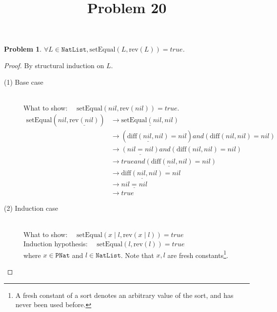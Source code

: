 \documentclass[12pt, a4paper]{article}
\title{Problem 20}
\date{\vspace{-5ex}}
\newtheorem{problem}{Problem}
\newcommand{\rel}[1]{\mathrel{#1}}
\newcommand{\rmx}[1]{\mathrm{#1}}
\newcommand{\larrow}{\longrightarrow}
\newcommand{\under}{\underline}
\begin{document}
\maketitle

\begin{problem}
$\forall L \in \mathtt{NatList}, \rmx{setEqual}(L, \rmx{rev}(L)) = true$.
\end{problem}
\begin{proof}
By structural induction on $L$.
\begin{description}
\item[(1) Base case]~\\
\noindent
What to show: $\quad \rmx{setEqual}(nil, \rmx{rev}(nil)) = true$.
\begin{align*}
\rmx{setEqual}(nil, \under{\rmx{rev}(nil)})
	&\larrow \under{\rmx{setEqual}(nil, nil)} \tag{by rev1} \\
	&\larrow (\under{\rmx{diff}(nil, nil)} = nil) \rel{and} (\rmx{diff}(nil, nil) = nil) \tag{by setEq} \\
	&\larrow \under{(nil = nil)} \rel{and} (\rmx{diff}(nil, nil) = nil) \tag{by diff1} \\
	&\larrow \under{true \rel{and} (\rmx{diff}(nil, nil) = nil)} \tag{by equality} \\
	&\larrow \under{\rmx{diff}(nil, nil)} = nil \tag{by and} \\
	&\larrow \under{nil = nil} \tag{by diff1} \\
	&\larrow true \tag{by equality} 
\end{align*}

\item[(2) Induction case]~\\
What to show: $\quad \rmx{setEqual}(x \mid l, \rmx{rev}(x \mid l)) = true$\\
Induction hypothesis: $\quad \rmx{setEqual}(l, \rmx{rev}(l)) = true$  \\
where $x \in \mathtt{PNat}$ and $l \in \mathtt{NatList}$.
Note that $x, l$ are fresh constants\footnote{A fresh constant of a sort denotes an arbitrary value of the sort, and has never been used before.}.


\end{description}
\end{proof}
\end{document}
